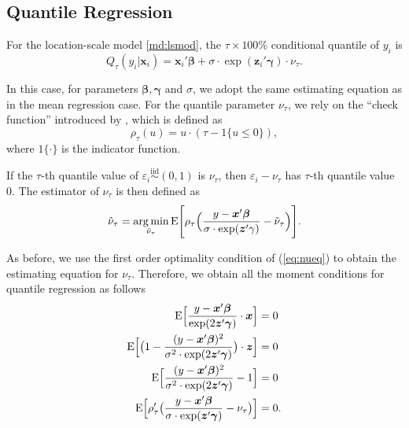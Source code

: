 \documentclass[article]{jss}
\newcommand{\s}{\sigma}
\newcommand{\xx}{\bm x}
\newcommand{\zz}{\bm z}
\newcommand{\bbe}{\bm \beta}
\newcommand{\gga}{\bm \gamma}
\newcommand{\g}{\gamma}
\renewcommand{\E}{\textrm{E}}
\DeclareMathOperator*{\argmin}{arg\,min}
\newcommand{\e}{\varepsilon}
\newcommand{\iid}{\stackrel {\textrm{iid}}{\sim}}
\renewcommand{\|}{\,|\,}
\begin{document}
\hypertarget{quantile-regression}{%
\subsection{Quantile Regression}\label{quantile-regression}}

For the location-scale model \eqref{md:lsmod}, the \(\tau\times 100\%\) conditional quantile of \(y_i\) is
\begin{equation} \label{eq:lsqr}
  Q_{\tau}(y_i|\xx_i) = \xx_i' \bbe + \s\cdot\exp(\zz_i' \gga)\cdot\nu_{\tau}.
\end{equation}

In this case, for parameters \(\bbe,\gga\) and \(\s\), we adopt the same estimating equation as in the mean regression case. For the quantile parameter \(\nu_{\tau}\), we rely on the ``check function'' introduced by \citet{koenker-bassett1978}, which is defined as
\begin{equation}\label{eq:check}
\rho_\tau(u) = u\cdot(\tau - \mathfrak 1 \{u \le 0\}),
\end{equation}
where \(\mathfrak 1\{\cdot\}\) is the indicator function.

If the \(\tau\)-th quantile value of \(\e_i\iid(0,1)\) is \(\nu_{\tau}\), then \(\e_i-\nu_{\tau}\) has \(\tau\)-th quantile value \(0\). The estimator of \(\nu_{\tau}\) is then defined as
\begin{equation}\label{eq:nueq}
  \hat\nu_{\tau} = \argmin_{\tilde\nu_{\tau}} \E\Biggl[\rho_{\tau}\Bigl(\frac{y-\xx'\bbe}{\s\cdot\exp(\zz'\g)}-\tilde\nu_{\tau}\Bigr)\Biggr].
\end{equation}

As before, we use the first order optimality condition of (\ref{eq:nueq}) to obtain the estimating equation for \(\nu_{\tau}\). Therefore, we obtain all the moment conditions for quantile regression as follows
\begin{equation} \label{eq:qrls}
\begin{split}
  \E\Bigl[\frac{y-\xx'\bbe}{\exp(2\zz'\gga)}\cdot\xx\Bigr] &= 0 \\
  \E\Bigl[\bigl(1-\frac{(y-\xx'\bbe)^2}{\s^2\cdot\exp(2\zz'\gga)}\bigr)\cdot\zz\Bigr] &= 0 \\
  \E\Bigl[\frac{(y-\xx'\bbe)^2}{\s^2\cdot\exp(2\zz'\gga)}-1\Bigr] &= 0 \\
  \E\Bigl[\rho'_{\tau}\bigl(\frac{y-\xx'\bbe}{\s\cdot\exp(\zz'\gga)}-\nu_{\tau}\bigr)\Bigr] &= 0.
\end{split}
\end{equation}
\end{document}
